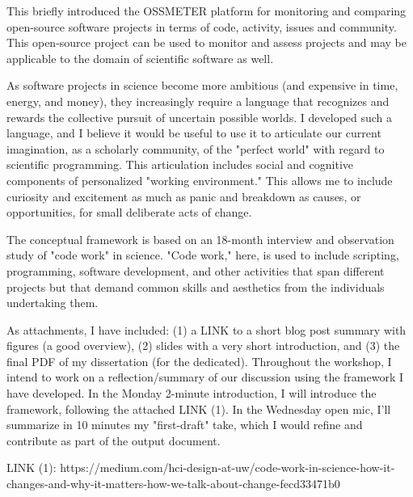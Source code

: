 \documentclass[a4paper,UKenglish]{dagrep}
\begin{document}

This briefly introduced the OSSMETER platform for monitoring and comparing open-source software projects in terms of code, activity, issues and community. This open-source project can be used to monitor and assess projects and may be applicable to the domain of scientific software as well.


As software projects in science become more ambitious (and expensive in time, energy, and money), they increasingly require a language that recognizes and rewards the collective pursuit of uncertain possible worlds. I developed such a language, and I believe it would be useful to use it to articulate our current imagination, as a scholarly community, of the "perfect world" with regard to scientific programming. This articulation includes social and cognitive components of personalized "working environment." This allows me to include curiosity and excitement as much as panic and breakdown as causes, or opportunities, for small deliberate acts of change.

The conceptual framework is based on an 18-month interview and observation study of "code work" in science. "Code work," here, is used to include scripting, programming, software development, and other activities that span different projects but that demand common skills and aesthetics from the individuals undertaking them.

As attachments, I have included: (1) a LINK to a short blog post summary with figures (a good overview), (2) slides with a very short introduction, and (3) the final PDF of my dissertation (for the dedicated). Throughout the workshop, I intend to work on a reflection/summary of our discussion using the framework I have developed. In the Monday 2-minute introduction, I will introduce the framework, following the attached LINK (1). In the Wednesday open mic, I'll summarize in 10 minutes my "first-draft" take, which I would refine and contribute as part of the output document.

LINK (1): https://medium.com/hci-design-at-uw/code-work-in-science-how-it-changes-and-why-it-matters-how-we-talk-about-change-fecd33471b0

\end{document}
